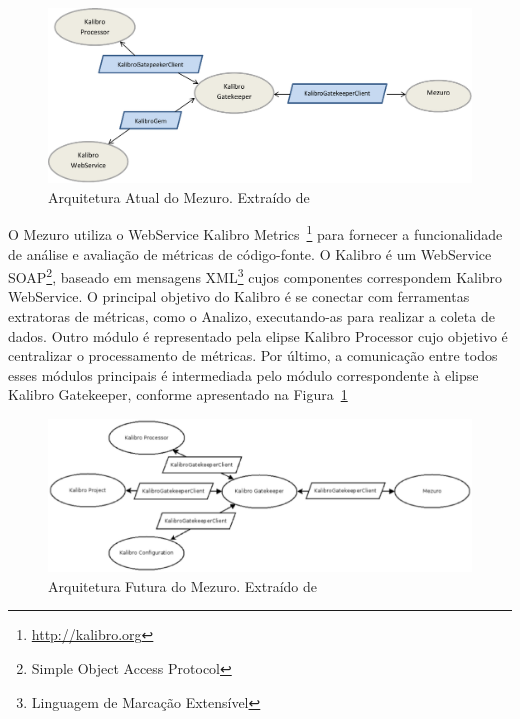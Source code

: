 \graphicspath{{figuras/}}
\begin{figure}[h]
\centering
\includegraphics[width=1.0\textwidth]{MezuroAtual.eps}
\caption{Arquitetura Atual do Mezuro. Extraído de \cite{manzo2014}}
\label{fig:mezuro-current-design}
\end{figure}


O Mezuro utiliza o WebService Kalibro Metrics~\footnote{\url{http://kalibro.org}} para fornecer a funcionalidade de análise e avaliação de métricas de código-fonte.
%
O Kalibro é um WebService SOAP\footnote{Simple Object Access Protocol}, baseado em mensagens XML\footnote{Linguagem de Marcação Extensível} cujos componentes correspondem Kalibro WebService.
%
O principal objetivo do Kalibro é se conectar com ferramentas extratoras de métricas, como o Analizo, executando-as para realizar a coleta de dados.
%
Outro módulo é representado pela elipse Kalibro Processor cujo objetivo é centralizar o processamento de métricas.
%
Por último, a comunicação entre todos esses módulos principais é intermediada pelo módulo correspondente à elipse Kalibro Gatekeeper, conforme apresentado
na Figura~\ref{fig:mezuro-current-design}

%

\graphicspath{{figuras/}}
\begin{figure}[h]
\centering
\includegraphics[width=1.0\textwidth]{MezuroNovaArquitetura.eps}
\caption{Arquitetura Futura do Mezuro. Extraído de \cite{manzo2014}}
\label{fig:mezuro-future-design}
\end{figure}


